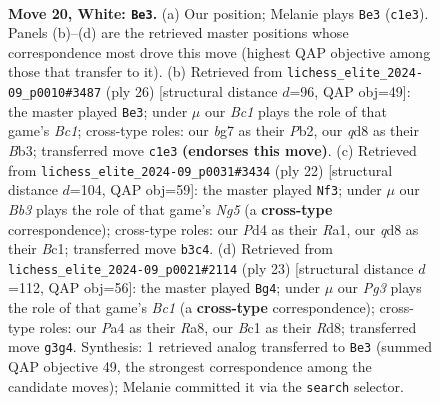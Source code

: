 \documentclass[11pt]{article}
\begin{document}
\clearpage

\begin{figure}[p]\centering
\begin{subfigure}{0.46\textwidth}\centering
\resizebox{\linewidth}{!}{%
\newchessgame
\chessboard[
  setfen={rnbqr1k1/pp3pb1/4pnp1/2Qp3p/P2P3P/1B3NP1/RPP2P1K/1NB1R3 w - - 3 20},
  showmover=false,
  pgfstyle=straightmove, color=movearrow, markmove={c1-e3}
]}
\caption{}
\end{subfigure}\hfill
\begin{subfigure}{0.46\textwidth}\centering
\resizebox{\linewidth}{!}{%
\newchessgame
\chessboard[
  setfen={r2qr1k1/1b1nppbp/p4np1/1p1P4/8/QBNP1N2/PP3PPP/R1B1R1K1 w - - 2 14},
  showmover=false,
  pgfstyle=straightmove, color=movearrow, markmove={c1-e3}
]}
\caption{}
\end{subfigure}
\\[4pt]
\begin{subfigure}{0.46\textwidth}\centering
\resizebox{\linewidth}{!}{%
\newchessgame
\chessboard[
  setfen={rnb2rk1/pp2ppbp/1qp2np1/6N1/2pP4/Q1N3PP/PP2PPB1/R1B2RK1 w - - 1 12},
  showmover=false,
  pgfstyle=straightmove, color=movearrow, markmove={g5-f3}
]}
\caption{}
\end{subfigure}\hfill
\begin{subfigure}{0.46\textwidth}\centering
\resizebox{\linewidth}{!}{%
\newchessgame
\chessboard[
  setfen={r1br2k1/pp2qpp1/1bn2n1p/4p3/1P6/PQNP1NP1/4PPBP/R1B2RK1 b - - 2 12},
  showmover=false,
  pgfstyle=straightmove, color=movearrow, markmove={c8-g4}
]}
\caption{}
\end{subfigure}
\caption{\textbf{Move 20, White: \texttt{Be3}.} (a) Our position; Melanie plays \texttt{Be3} (\texttt{c1e3}). Panels (b)--(d) are the retrieved master positions whose correspondence most drove this move (highest QAP objective among those that transfer to it). (b) Retrieved from \texttt{lichess\_elite\_2024-09\_p0010\#3487} (ply 26) [structural distance $d$=96, QAP obj=49]: the master played \texttt{Be3}; under $\mu$ our \emph{Bc1} plays the role of that game's \emph{Bc1}; cross-type roles: our \emph{b}g7 as their \emph{P}b2, our \emph{q}d8 as their \emph{B}b3; transferred move \texttt{c1e3} \textbf{(endorses this move)}. (c) Retrieved from \texttt{lichess\_elite\_2024-09\_p0031\#3434} (ply 22) [structural distance $d$=104, QAP obj=59]: the master played \texttt{Nf3}; under $\mu$ our \emph{Bb3} plays the role of that game's \emph{Ng5} (a \textbf{cross-type} correspondence); cross-type roles: our \emph{P}d4 as their \emph{R}a1, our \emph{q}d8 as their \emph{B}c1; transferred move \texttt{b3c4}. (d) Retrieved from \texttt{lichess\_elite\_2024-09\_p0021\#2114} (ply 23) [structural distance $d$=112, QAP obj=56]: the master played \texttt{Bg4}; under $\mu$ our \emph{Pg3} plays the role of that game's \emph{Bc1} (a \textbf{cross-type} correspondence); cross-type roles: our \emph{P}a4 as their \emph{R}a8, our \emph{B}c1 as their \emph{R}d8; transferred move \texttt{g3g4}. Synthesis: 1 retrieved analog transferred to \texttt{Be3} (summed QAP objective 49, the strongest correspondence among the candidate moves); Melanie committed it via the \texttt{search} selector.}
\label{fig:thought-m38}
\end{figure}
\end{document}
